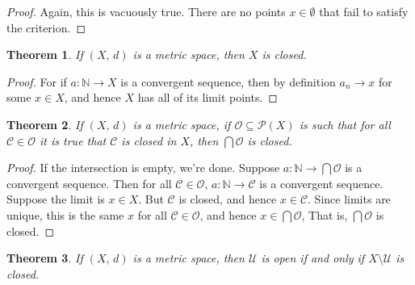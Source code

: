\documentclass{article}
\theoremstyle{plain}
\newtheorem{theorem}{Theorem}[section]
\theoremstyle{normal}
\begin{document}
        \begin{proof}
            Again, this is vacuously true. There are no points
            $x\in\emptyset$ that fail to satisfy the criterion.
        \end{proof}
        \begin{theorem}
            If $(X,\,d)$ is a metric space, then $X$ is closed.
        \end{theorem}
        \begin{proof}
            For if $a:\mathbb{N}\rightarrow{X}$ is a convergent sequence,
            then by definition $a_{n}\rightarrow{x}$ for some $x\in{X}$,
            and hence $X$ has all of its limit points.
        \end{proof}
        \begin{theorem}
            If $(X,\,d)$ is a metric space, if
            $\mathcal{O}\subseteq\mathcal{P}(X)$ is such that for all
            $\mathcal{C}\in\mathcal{O}$ it is true that $\mathcal{C}$ is closed
            in $X$, then $\bigcap\mathcal{O}$ is closed.
        \end{theorem}
        \begin{proof}
            If the intersection is empty, we're done. Suppose
            $a:\mathbb{N}\rightarrow\bigcap\mathcal{O}$ is a convergent
            sequence. Then for all $\mathcal{C}\in\mathcal{O}$,
            $a:\mathbb{N}\rightarrow\mathcal{C}$ is a convergent sequence.
            Suppose the limit is $x\in{X}$. But $\mathcal{C}$ is closed, and
            hence $x\in\mathcal{C}$. Since limits are unique, this is the
            same $x$ for all $\mathcal{C}\in\mathcal{O}$, and hence
            $x\in\bigcap\mathcal{O}$, That is, $\bigcap\mathcal{O}$ is closed.
        \end{proof}
        \begin{theorem}
            If $(X,\,d)$ is a metric space, then
            $\mathcal{U}$ is open if and only if $X\setminus\mathcal{U}$ is
            closed.
        \end{theorem}
\end{document}
